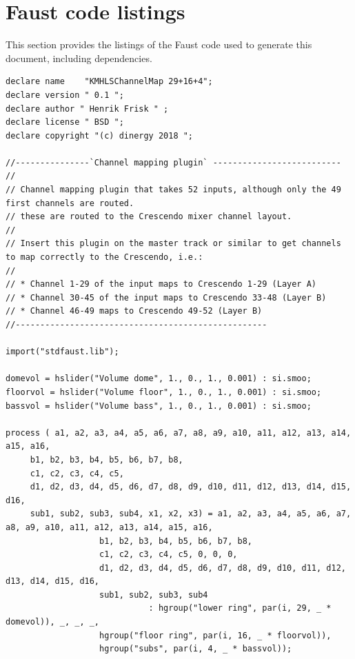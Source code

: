 \documentclass{article}
\begin{document}
 \section{Faust code listings} \label{listing}  This section provides the listings of the Faust code used to generate this document, including dependencies. 
\bigskip\bigskip
\begin{lstlisting}[caption=\texttt{KMHLS\_channel\_map.dsp}]
declare name	"KMHLSChannelMap 29+16+4";
declare version " 0.1 ";
declare author " Henrik Frisk " ;
declare license " BSD ";
declare copyright "(c) dinergy 2018 ";

//---------------`Channel mapping plugin` --------------------------
//
// Channel mapping plugin that takes 52 inputs, although only the 49 first channels are routed.
// these are routed to the Crescendo mixer channel layout.
// 
// Insert this plugin on the master track or similar to get channels to map correctly to the Crescendo, i.e.:
// 
// * Channel 1-29 of the input maps to Crescendo 1-29 (Layer A)
// * Channel 30-45 of the input maps to Crescendo 33-48 (Layer B)
// * Channel 46-49 maps to Crescendo 49-52 (Layer B)
//---------------------------------------------------

import("stdfaust.lib");

domevol = hslider("Volume dome", 1., 0., 1., 0.001) : si.smoo;
floorvol = hslider("Volume floor", 1., 0., 1., 0.001) : si.smoo;
bassvol = hslider("Volume bass", 1., 0., 1., 0.001) : si.smoo;

process ( a1, a2, a3, a4, a5, a6, a7, a8, a9, a10, a11, a12, a13, a14, a15, a16,
	 b1, b2, b3, b4, b5, b6, b7, b8,
	 c1, c2, c3, c4, c5,
	 d1, d2, d3, d4, d5, d6, d7, d8, d9, d10, d11, d12, d13, d14, d15, d16,
	 sub1, sub2, sub3, sub4, x1, x2, x3) = a1, a2, a3, a4, a5, a6, a7, a8, a9, a10, a11, a12, a13, a14, a15, a16,
				   b1, b2, b3, b4, b5, b6, b7, b8,
				   c1, c2, c3, c4, c5, 0, 0, 0,
				   d1, d2, d3, d4, d5, d6, d7, d8, d9, d10, d11, d12, d13, d14, d15, d16,
				   sub1, sub2, sub3, sub4
						     : hgroup("lower ring", par(i, 29, _ * domevol)), _, _, _,
				   hgroup("floor ring", par(i, 16, _ * floorvol)),
				   hgroup("subs", par(i, 4, _ * bassvol));
  
\end{lstlisting}
\end{document}
